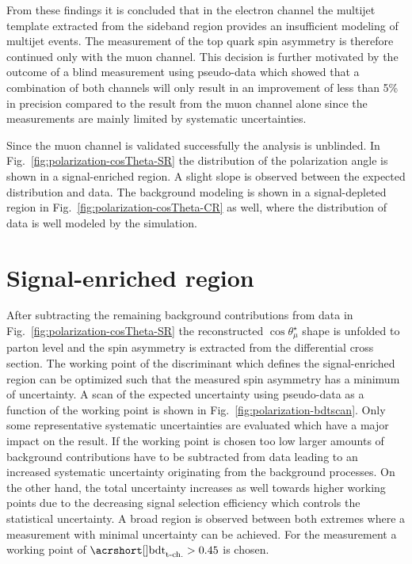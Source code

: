 From these findings it is concluded that in the electron channel the multijet template extracted from the sideband region provides an insufficient modeling of multijet events. The measurement of the top quark spin asymmetry is therefore continued only with the muon channel. This decision is further motivated by the outcome of a blind measurement using pseudo-data which showed that a combination of both channels will only result in an improvement of less than 5\% in precision compared to the result from the muon channel alone since the measurements are mainly limited by systematic uncertainties.

Since the muon channel is validated successfully the analysis is unblinded. In Fig.~\ref{fig:polarization-cosTheta-SR} the distribution of the polarization angle is shown in a signal-enriched region. A slight slope is observed between the expected distribution and data. The background modeling is shown in a signal-depleted region in Fig.~\ref{fig:polarization-cosTheta-CR} as well, where the distribution of data is well modeled by the simulation.



\section{Signal-enriched region}
\label{sec:polarization-optimization}

After subtracting the remaining background contributions from data in Fig.~\ref{fig:polarization-cosTheta-SR} the reconstructed $\cos\theta_{\mu}^\star$ shape is unfolded to parton level and the spin asymmetry is extracted from the differential cross section. The working point of the \bdttch discriminant which defines the signal-enriched region can be optimized such that the measured spin asymmetry has a minimum of uncertainty. A scan of the expected uncertainty using pseudo-data as a function of the \bdttch working point is shown in Fig.~\ref{fig:polarization-bdtscan}. Only some representative systematic uncertainties are evaluated which have a major impact on the result. If the working point is chosen too low larger amounts of background contributions have to be subtracted from data leading to an increased systematic uncertainty originating from the background processes. On the other hand, the total uncertainty increases as well towards higher working points due to the decreasing signal selection efficiency which controls the statistical uncertainty. A broad region is observed between both extremes where a measurement with minimal uncertainty can be achieved. For the measurement a working point of $\bdttch>0.45$ is chosen.

